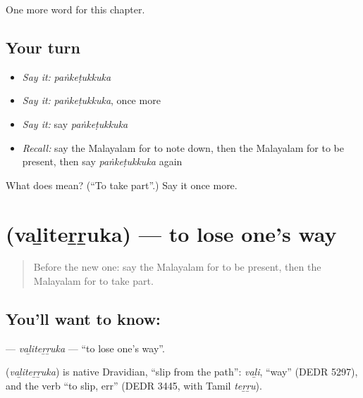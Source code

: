\begin{grammarlens}[title={What you've built}]
One more word for this chapter.
\end{grammarlens}

\subsection*{Your turn}
\begin{itemize}
\raggedright
  \item \emph{Say it:} \emph{paṅkeṭukkuka}
  \item \emph{Say it:} \emph{paṅkeṭukkuka}, once more
  \item \emph{Say it:} say \emph{paṅkeṭukkuka}
  \item \emph{Recall:} say the Malayalam for to note down, then the Malayalam for to be present, then say \emph{paṅkeṭukkuka} again
\end{itemize}

\begin{tcolorbox}[breakable,colback=teal!4,colframe=teal!35!black,title={Before you move on}]
What does  mean? (\textquotedblleft{}To take part\textquotedblright{}.) Say it once more.
\end{tcolorbox}
\section[\texorpdfstring{\ml{വഴിതെറ്റുക} (vaḻiteṟṟuka)}{വഴിതെറ്റുക (vaḻiteṟṟuka)}]{ (vaḻiteṟṟuka) — to lose one's way}

\label{lesson:ML-C227-valiterruka}



\begin{quote}
Before the new one: say the Malayalam for to be present, then the Malayalam for to take part.
\end{quote}

\subsection*{You'll want to know: }
\textbf{} — \emph{vaḻiteṟṟuka} — \textquotedblleft{}to lose one's way\textquotedblright{}.

\begin{cousinweb}
\textbf{} (\emph{vaḻiteṟṟuka}) is native Dravidian, \textquotedblleft{}slip from the path\textquotedblright{}: \emph{vaḻi}, \textquotedblleft{}way\textquotedblright{} (DEDR 5297), and the verb \textquotedblleft{}to slip, err\textquotedblright{} (DEDR 3445, with Tamil \emph{teṟṟu}).
\end{cousinweb}

